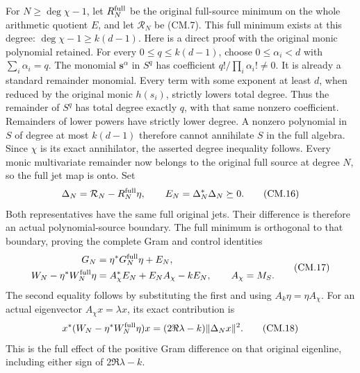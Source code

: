 For \(N\ge\deg\chi-1\), let \(R^{\rm full}_N\) be the original
full-source minimum on the whole arithmetic quotient \(E\), and let
\(\mathcal R_N\) be (CM.7). This full minimum exists at this degree:
\(\deg\chi-1\ge k(d-1)\). Here is a direct proof with the original
monic polynomial retained. For every \(0\le q\le k(d-1)\), choose
\(0\le\alpha_i<d\) with \(\sum_i\alpha_i=q\). The monomial
\(\mathbf s^\alpha\) in \(S^q\) has coefficient
\(q!/\prod_i\alpha_i!\ne0\). It is already a standard remainder
monomial. Every term with some exponent at least \(d\), when reduced
by the original monic \(h(s_i)\), strictly lowers total degree.
Thus the remainder of \(S^q\) has total degree exactly \(q\), with
that same nonzero coefficient. Remainders of lower powers have strictly
lower degree. A nonzero polynomial in \(S\) of degree at most
\(k(d-1)\) therefore cannot annihilate \(S\) in the full algebra.
Since \(\chi\) is its exact annihilator, the asserted degree inequality
follows. Every monic multivariate remainder now belongs to the original
full source at degree \(N\), so the full jet map is onto. Set
\[
 \Delta_N=\mathcal R_N-R^{\rm full}_N\eta,
 \qquad E_N=\Delta_N^*\Delta_N\succeq0.
 \tag{CM.16}
\]
Both representatives have the same full original jets. Their difference
is therefore an actual polynomial-source boundary. The full minimum
is orthogonal to that boundary, proving the complete Gram and control
identities
\[
 \begin{aligned}
 G_N&=\eta^*G_N^{\rm full}\eta+E_N,\\
 W_N-\eta^*W_N^{\rm full}\eta
     &=A_\chi^*E_N+E_NA_\chi-kE_N,\qquad A_\chi=M_S.
 \end{aligned}
 \tag{CM.17}
\]
The second equality follows by substituting the first and using
\(A_k\eta=\eta A_\chi\). For an actual eigenvector
\(A_\chi x=\lambda x\), its exact contribution is
\[
 x^*(W_N-\eta^*W_N^{\rm full}\eta)x
       =(2\Re\lambda-k)\|\Delta_Nx\|^2.
 \tag{CM.18}
\]
This is the full effect of the positive Gram difference on that
original eigenline, including either sign of \(2\Re\lambda-k\).

